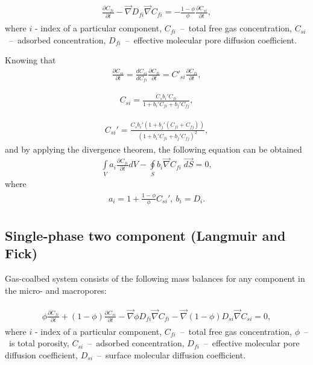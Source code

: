 \documentclass[a4paper,14pt,english]{extreport}
\begin{document}
\begin{eqnarray}
\begin{gathered}
\label{eq:diffusuin_multicomp_diff}
\frac{\partial C_{fi}}{\partial t} - \vec{\nabla} D_{fi} \vec{\nabla}C_{fi} = - \frac{1 - \phi}{\phi} \frac{\partial C_{si}}{\partial t},
\end{gathered}
\end{eqnarray}
where $i$ - index of  a particular component, $C_{fi}$~--~total free gas concentration, $C_{si}$~--~adsorbed concentration, $D_{fi}$~--~effective molecular pore diffusion coefficient.

Knowing that
\begin{eqnarray}
\label{eq:variable_replace_timeder}
\frac{\partial C_{si}}{\partial t} =  \frac{dC_{si}}{dC_{fi}}\frac{\partial C_{fi}}{\partial t} = C'_{si}\frac{\partial C_{fi}}{\partial t},
\end{eqnarray}

\begin{eqnarray}
\label{eq:conc_sorption}
C_{si} =  \frac{C_{s} b_{i}' C_{fi}}{1+b_{i}'C_{fi}+b_{j}'C_{fj}},
\end{eqnarray}

\begin{eqnarray}
\label{eq:conc_sorption_deriv}
C_{si}' =  \frac{C_{s}b_{i}' \left(1+b_{j}'\left(C_{fi}+C_{fj}\right)\right)}{\left(1+b_{i}'C_{fi}+b_{j}'C_{fj}\right)^2},
\end{eqnarray}
and by applying the divergence theorem, the following equation can be obtained
\begin{eqnarray}
\label{eq:diffusuin_multicomp_integral}
\int \limits_{V} a_{i} \frac{\partial C_{fi}}{\partial t} dV - \oint \limits_{S} b_{i} \vec{\nabla}C_{fi} \; \vec{dS} = 0,
\end{eqnarray}
where
\begin{eqnarray}
\begin{gathered}
\label{eq:alpha}
a_{i}  =  1+\frac{1 - \phi}{\phi}C_{si}', \: b_{i}  = D_{i}.
\end{gathered}
\end{eqnarray}

 \subsection*{Single-phase two component (Langmuir and Fick)}
 Gas-coalbed system consists of the following mass balances for any component in the micro- and macropores:
 
 \begin{eqnarray}
 \begin{gathered}
 \label{eq:diffusuin_multicomp_diff}
  \phi\frac{\partial C_{fi}}{\partial t} + \left(1-\phi\right)\frac{\partial C_{si}}{\partial t} - \vec{\nabla} \phi D_{fi} \vec{\nabla}C_{fi} - \vec{\nabla}\left(1-\phi \right) D_{si} \vec{\nabla}C_{si} = 0,
   \end{gathered}
 \end{eqnarray}
 where $i$ - index of  a particular component, $C_{fi}$~--~total free gas concentration, $\phi$~--~is total porosity, $C_{si}$~--~adsorbed concentration, $D_{fi}$~--~effective molecular pore diffusion coefficient, $D_{si}$~--~surface molecular diffusion coefficient.
 
\end{document}
